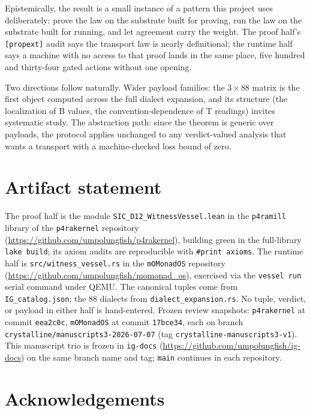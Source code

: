 \documentclass[12pt,a4paper]{article}
\newcommand{\bT}{\textsf{T}}
\newcommand{\bB}{\textsf{B}}
\begin{document}
Epistemically, the result is a small instance of a pattern this project uses
deliberately: prove the law on the substrate built for proving, run the law on
the substrate built for running, and let agreement carry the weight.  The proof
half's \texttt{[propext]} audit says the transport law is nearly definitional;
the runtime half says a machine with no access to that proof lands in the same
place, five hundred and thirty-four gated actions without one opening.

Two directions follow naturally.  Wider payload families: the $3 \times 88$
matrix is the first object computed across the full dialect expansion, and its
structure (the localization of \bB{} values, the convention-dependence of
\bT{} readings) invites systematic study.  The abstraction path: since the
theorem is generic over payloads, the protocol applies unchanged to any
verdict-valued analysis that wants a transport with a machine-checked loss bound
of zero.

\section{Artifact statement}

The proof half is the module
\texttt{SIC\_D12\_WitnessVessel.lean} in the \texttt{p4ramill} library of the
\texttt{p4rakernel} repository
(\url{https://github.com/umpolungfish/p4rakernel}), building green in the
full-library \texttt{lake build}; its axiom audits are reproducible with
\texttt{\#print axioms}.  The runtime half is \texttt{src/witness\_vessel.rs} in
the \texttt{mOMonadOS} repository
(\url{https://github.com/umpolungfish/momonad_os}), exercised via the
\texttt{vessel run} serial command under QEMU.  The canonical tuples come from
\texttt{IG\_catalog.json}; the $88$ dialects from \texttt{dialect\_expansion.rs}.
No tuple, verdict, or payload in either half is hand-entered.  Frozen review
snapshots: \texttt{p4rakernel} at commit \texttt{eea2c0c}, \texttt{mOMonadOS} at
commit \texttt{17bce34}, each on branch \texttt{crystalline/manuscripts3-2026-07-07}
(tag \texttt{crystalline-manuscripts3-v1}).  This manuscript trio is frozen in
\texttt{ig-docs} (\url{https://github.com/umpolungfish/ig-docs}) on the same
branch name and tag; \texttt{main} continues in each repository.

\section{Acknowledgements}
\end{document}
